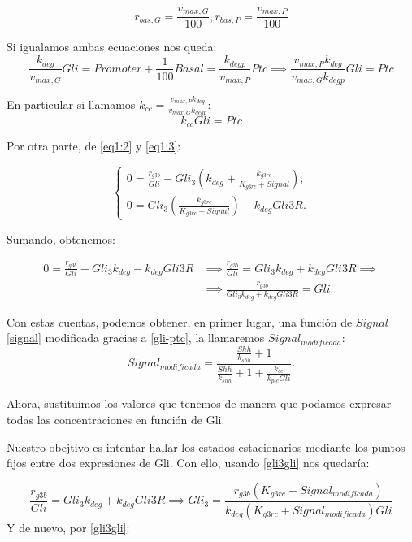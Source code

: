 $$
r_{bas,G}=\frac{v_{max,G}}{100},r_{bas,P}=\frac{v_{max,P}}{100}
$$

Si igualamos ambas ecuaciones nos queda:
\begin{equation*}
\frac{k_{deg}}{v_{max,G}}Gli=Promoter+\frac{1}{100}Basal=\frac{k_{degp}}{v_{max,P}}Ptc \implies \frac{v_{max,P}k_{deg}}{v_{max,G}k_{degp}}Gli=Ptc
\end{equation*}

 En particular si llamamos $k_{cc}=\frac{v_{max,P}k_{deg}}{v_{max,G}k_{degp}}$:
 \begin{equation}
k_{cc}Gli=Ptc
\label{gli-ptc}
 \end{equation}


Por otra parte, de \ref{eq1:2} y \ref{eq1:3}:



$$\begin{cases} 0 = \frac{r_{g3b}}{Gli}-Gli_3\left(k_{deg}+\frac{k_{g3rc}}{K_{g3rc}+Signal}\right), \\0=Gli_3\left(\frac{k_{g3rc}}{K_{g3rc}+Signal}\right)-k_{deg}Gli3R. \end{cases}$$

Sumando, obtenemos:

\begin{equation}
\begin{split}
0=\frac{r_{g3b}}{Gli}-Gli_3k_{deg}-k_{deg}Gli3R & \implies \frac{r_{g3b}}{Gli}=Gli_3k_{deg}+k_{deg}Gli3R\implies
\\
& \implies \frac{r_{g3b}}{Gli_3k_{deg}+k_{deg}Gli3R}=Gli
\end{split}
\label{gli3gli}
\end{equation}

Con estas cuentas, podemos obtener, en primer lugar, una función de $Signal$\ref{signal} modificada gracias a \ref{gli-ptc}, la llamaremos $Signal_{modificada}$:
\begin{equation}
Signal_{modificada}=\frac{\frac{Shh}{k_{shh}} + 1}{\frac{Shh}{k_{shh}} + 1 + \frac{k_{cc}}{k_{ptc}Gli}}.
\end{equation}

Ahora, sustituimos los valores que tenemos de manera que podamos expresar todas las concentraciones en función de Gli. 

Nuestro obejtivo es intentar hallar los estados estacionarios mediante los puntos fijos entre dos expresiones de Gli. Con ello, usando \ref{gli3gli} nos quedaría:

\begin{equation}
 \frac{r_{g3b}}{Gli}=Gli_3k_{deg}+k_{deg}Gli3R
 \implies Gli_3=\frac{r_{g3b}(K_{g3rc}+Signal_{modificada})}{k_{deg}(K_{g3rc}+Signal_{modificada})Gli}
\label{equgli3}
\end{equation}
 Y de nuevo, por  \ref{gli3gli}:
 
